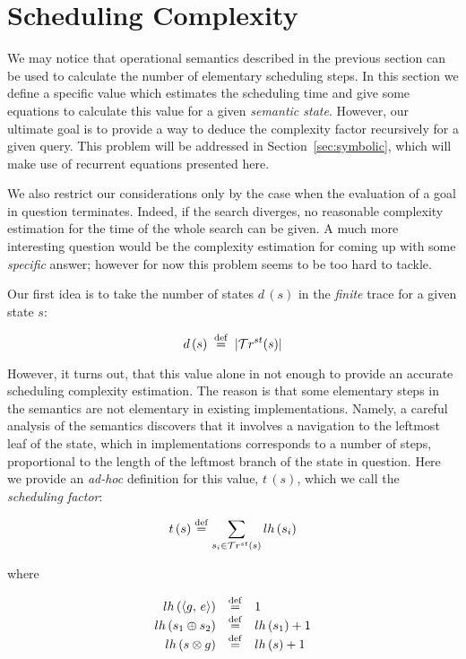 \section{Scheduling Complexity}
\label{sec:scheduling}

We may notice that operational semantics described in the previous section can be used to calculate the number of elementary scheduling steps.
In this section we define a specific value which estimates the scheduling time and give some equations to calculate this value for a given \emph{semantic
state}. However, our ultimate goal is to provide a way to deduce the complexity factor recursively for a given query. This problem will be addressed in
Section~\ref{sec:symbolic}, which will make use of recurrent equations presented here.

We also restrict our considerations only by the case when the evaluation of a goal in question terminates. Indeed,
if the search diverges, no reasonable complexity estimation for the time of the whole search can be given. A much more interesting question would be
the complexity estimation for coming up with some \emph{specific} answer; however for now this problem seems to be too hard to
tackle.

Our first idea is to take the number of states $d\,(s)$ in the \emph{finite} trace for a given state $s$:

\[ d\,(s) \; \overset{\mathrm{def}}{=} \; | \mathcal{T}r^{st}(s) |  \]

However, it turns out, that this value alone in not enough to provide an accurate scheduling complexity estimation. The reason is that some
elementary steps in the semantics are not elementary in existing implementations. Namely, a careful analysis of the semantics discovers that
it involves a navigation to the leftmost leaf of the state, which in implementations corresponds to a number of
steps, proportional to the length of the leftmost branch of the state in question. Here we provide an \emph{ad-hoc} definition for this value, $t\,(s)$, which we call the
\emph{scheduling factor}:

\[
t\,(s) \overset{\mathrm{def}}{=} \sum\limits_{s_i \in \mathcal{T}r^{st}(s)} lh\,(s_i) 
\]

where

\[
\begin{array}{rcl}
 lh\,(\langle g ,\, e \rangle)  &\overset{\mathrm{def}}{=}& 1 \\
 lh\,(s_1 \oplus s_2) &\overset{\mathrm{def}}{=}& lh\,(s_1) + 1 \\
 lh\,(s \otimes g)    &\overset{\mathrm{def}}{=}& lh\,(s) + 1 \\
\end{array}
\]


